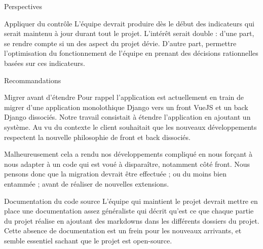 \documentclass[]{article}
\begin{document}
{\begin{section}{Perspectives}
 \begin{subsection}{Appliquer du contrôle}
    L'équipe devrait produire dès le début des indicateurs qui serait maintenu à jour durant tout le projet. L'intérêt serait double : d'une part, se rendre compte si un des aspect du projet dévie. D'autre part, permettre l'optimisation du fonctionnement de l'équipe en prenant des décisions rationnelles basées sur ces indicateurs.  
 \end{subsection}
\end{section}

\begin{section}{Recommandations}
 \begin{subsection}{Migrer avant d'étendre}
     Pour rappel l'application est actuellement en train de migrer d'une application monolothique Django vers un front VueJS et un back Django dissociés. Notre travail consistait à étendre l'application en ajoutant un système. Au vu du contexte le client souhaitait que les nouveaux développements respectent la nouvelle philosophie de front et back dissociés.

     Malheureusement cela a rendu nos développements compliqué en nous forçant à nous adapter à un code qui est voué à disparaître, notamment côté front. Nous pensons donc que la migration devrait être effectuée ; ou du moins bien entammée ; avant de réaliser de nouvelles extensions.
 \end{subsection}

 \begin{subsection}{Documentation du code source}
     L'équipe qui maintient le projet devrait mettre en place une documentation assez généraliste qui décrit qu'est ce que chaque partie du projet réalise en ajoutant des markdowns dans les différents dossiers du projet. Cette absence de documentation est un frein pour les nouveaux arrivants, et semble essentiel sachant que le projet est open-source.
 \end{subsection}
\end{section}

}
\end{document}
